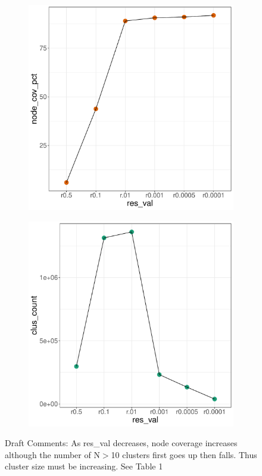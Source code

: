 \documentclass[12pt, oneside]{article}   	%
\begin{document}
	
\begin{figure}[H]
\centering
\begin{subfigure}[t]{0.48\textwidth}
\centering
\includegraphics[width=\linewidth]{node_cov.pdf}
\end{subfigure}
\hfill
\begin{subfigure}[t]{0.48\textwidth}
\centering
\includegraphics[width=\linewidth]{clus_count.pdf} 
\end{subfigure}
\captionsetup{width=0.9\textwidth}
\caption{Draft Comments: As res\_val decreases, node coverage increases although the number of N$>$10 clusters first goes up then falls. Thus cluster size must be increasing. See Table 1}
\label{fig:overlapping}
\end{figure}
\end{document}
